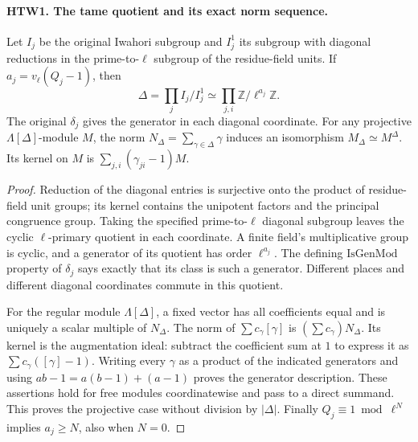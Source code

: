\paragraph{HTW1. The tame quotient and its exact norm sequence.}
\label{claim:HTW1}
Let \(I_j\) be the original Iwahori subgroup and \(I_j^1\)
its subgroup with diagonal reductions in the prime-to-\(\ell\)
subgroup of the residue-field units.  If
\(a_j=v_\ell(Q_j-1)\), then
\[
 \Delta=\prod_j I_j/I_j^1
       \simeq\prod_{j,i}\mathbb Z/\ell^{a_j}\mathbb Z .
 \tag{HTW.4}
\]
The original \(\delta_j\) gives the generator in each diagonal
coordinate.  For any projective \(\Lambda[\Delta]\)-module \(M\),
the norm \(N_\Delta=\sum_{\gamma\in\Delta}\gamma\) induces
an isomorphism \(M_\Delta\simeq M^\Delta\).  Its kernel on \(M\)
is \(\sum_{j,i}(\gamma_{ji}-1)M\).
\begin{proof}
Reduction of the diagonal entries is surjective onto the
product of residue-field unit groups; its kernel contains the
unipotent factors and the principal congruence group.  Taking
the specified prime-to-\(\ell\) diagonal subgroup leaves the
cyclic \(\ell\)-primary quotient in each coordinate.  A finite
field's multiplicative group is cyclic, and a generator of
its quotient has order \(\ell^{a_j}\).  The defining
\(\mathrm{IsGenMod}\) property of \(\delta_j\) says exactly
that its class is such a generator.  Different places and
different diagonal coordinates commute in this quotient.

For the regular module \(\Lambda[\Delta]\), a fixed vector
has all coefficients equal and is uniquely a scalar multiple
of \(N_\Delta\).  The norm of \(\sum c_\gamma[\gamma]\)
is \((\sum c_\gamma)N_\Delta\).  Its kernel is the
augmentation ideal: subtract the coefficient sum at \(1\)
to express it as \(\sum c_\gamma([\gamma]-1)\).
Writing every \(\gamma\) as a product of the indicated
generators and using \(ab-1=a(b-1)+(a-1)\) proves the
generator description.  These assertions hold for free
modules coordinatewise and pass to a direct summand.
This proves the projective case without division by
\(|\Delta|\).  Finally \(Q_j\equiv1\bmod\ell^N\) implies
\(a_j\ge N\), also when \(N=0\).
\end{proof}


